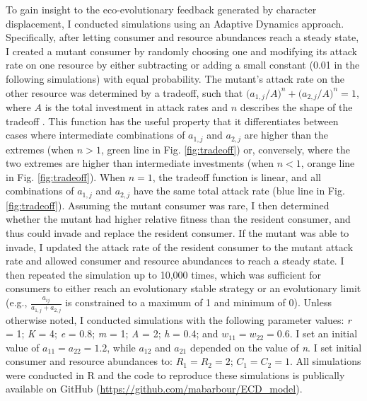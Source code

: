 \documentclass[11pt,]{article}
\begin{document}
To gain insight to the eco-evolutionary feedback generated by character
displacement, I conducted simulations using an Adaptive Dynamics
approach. Specifically, after letting consumer and resource abundances
reach a steady state, I created a mutant consumer by randomly choosing
one and modifying its attack rate on one resource by either subtracting
or adding a small constant (0.01 in the following simulations) with
equal probability. The mutant's attack rate on the other resource was
determined by a tradeoff, such that
\(\big(a_{\text{1},j}/{A}\big)^n+\big(a_{\text{2},j}/{A}\big)^n=1\),
where \(A\) is the total investment in attack rates and \(n\) describes
the shape of the tradeoff \citep{Sargent2006}. This function has the
useful property that it differentiates between cases where intermediate
combinations of \(a_{\text{1},j}\) and \(a_{\text{2},j}\) are higher
than the extremes (when \(n>1\), green line in Fig. \ref{fig:tradeoff})
or, conversely, where the two extremes are higher than intermediate
investments (when \(n<1\), orange line in Fig. \ref{fig:tradeoff}). When
\(n=1\), the tradeoff function is linear, and all combinations of
\(a_{\text{1},j}\) and \(a_{\text{2},j}\) have the same total attack
rate (blue line in Fig. \ref{fig:tradeoff}). Assuming the mutant
consumer was rare, I then determined whether the mutant had higher
relative fitness than the resident consumer, and thus could invade and
replace the resident consumer. If the mutant was able to invade, I
updated the attack rate of the resident consumer to the mutant attack
rate and allowed consumer and resource abundances to reach a steady
state. I then repeated the simulation up to 10,000 times, which was
sufficient for consumers to either reach an evolutionary stable strategy
\citep[ESS,][]{Smith1973} or an evolutionary limit (e.g.,
\(\frac{a_{ij}}{a_{\text{1},j}+a_{\text{2},j}}\) is constrained to a
maximum of 1 and minimum of 0). Unless otherwise noted, I conducted
simulations with the following parameter values: \emph{r} = 1; \emph{K}
= 4; \emph{e} = 0.8; \emph{m} = 1; \emph{A} = 2; \emph{h} = 0.4; and
\(w_{11} = w_{22} = 0.6\). I set an initial value of
\(a_{11} = a_{22} = 1.2\), while \(a_{12}\) and \(a_{21}\) depended on
the value of \emph{n}. I set initial consumer and resource abundances
to: \(R_1 = R_2 = 2\); \(C_1 = C_2 = 1\). All simulations were conducted
in R \citep{R} and the code to reproduce these simulations is publically
available on GitHub (\url{https://github.com/mabarbour/ECD_model}).
\end{document}
